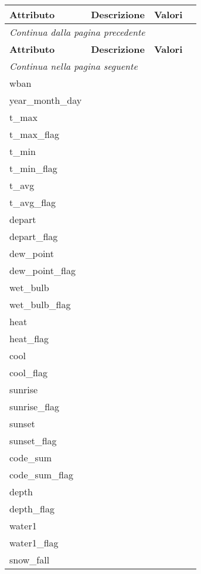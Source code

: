\begin{longtable}{lccc}
	\toprule
	\textbf{Attributo} \quad & \textbf{Descrizione} & \textbf{Valori} \\
	\midrule
	\endfirsthead
	\multicolumn{4}{l}{\footnotesize\itshape Continua dalla pagina precedente} \\
	\toprule
	\textbf{Attributo} \quad & \textbf{Descrizione} & \textbf{Valori} \\
	\midrule			
	\endhead
	\multicolumn{4}{l}{\footnotesize\itshape Continua nella pagina seguente} \\
	\endfoot
	\endlastfoot
	wban				& 	 & 			 	\\	
	year\_month\_day	& 	 & 			  	\\	
	t\_max				& 	 & 		   	\\
	t\_max\_flag		& 	 & 			   	\\	
	t\_min				& 	 & 		   	\\
	t\_min\_flag		& 	 & 			   	\\	
	t\_avg				& 	 & 		   	\\
	t\_avg\_flag		& 	 & 			   	\\	
	depart				& 	 & 		   	\\
	depart\_flag		& 	 & 			   	\\	
	dew\_point			& 	 & 		   	\\
	dew\_point\_flag	& 	 & 			   	\\		
	wet\_bulb			& 	 & 		   	\\
	wet\_bulb\_flag		& 	 & 			   	\\	
	heat				& 	 & 		   	\\
	heat\_flag			& 	 & 			   	\\	
	cool				& 	 & 		   	\\
	cool\_flag			& 	 & 			   	\\	
	sunrise				& 	 & 		   	\\
	sunrise\_flag		& 	 & 			   	\\	
	sunset				& 	 & 		   	\\
	sunset\_flag		& 	 & 		   	\\	
	code\_sum			& 	 & 		   	\\
	code\_sum\_flag		& 	 & 		   	\\	
	depth				& 	 & 		 	\\
	depth\_flag			& 	 & 		  	\\	
	water1				& 	 & 				\\
	water1\_flag		& 	 & 		  	\\	
	snow\_fall			& 	 & 				\\	

\end{longtable}
